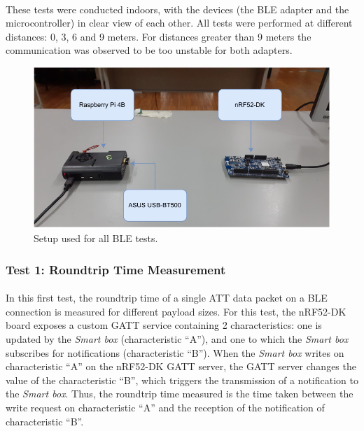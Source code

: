 \paragraph{} These tests were conducted indoors, with the devices (the \acs{BLE} adapter and the microcontroller) in clear view of each other. All tests were performed at different distances: 0, 3, 6 and 9 meters. For distances greater than 9 meters the communication was observed to be too unstable for both adapters. 

\begin{figure}[H]
    \centering
    \includegraphics[width=0.75\linewidth]{images/ble test setup.pdf}
    \caption{Setup used for all \acs{BLE} tests.}
    \label{fig:ble-test-setup}
\end{figure}

\subsubsection{Test 1: Roundtrip Time Measurement}

\paragraph{} In this first test, the roundtrip time of a single \acs{ATT} data packet on a \acs{BLE} connection is measured for different payload sizes. For this test, the nRF52-DK board exposes a custom \acs{GATT} service containing 2 characteristics: one is updated by the \textit{Smart box} (characteristic ``A''), and one to which the \textit{Smart box} subscribes for notifications (characteristic ``B''). When the \textit{Smart box} writes on characteristic ``A'' on the nRF52-DK \acs{GATT} server, the \acs{GATT} server changes the value of the characteristic ``B'', which triggers the transmission of a notification to the \textit{Smart box}. Thus, the roundtrip time measured is the time taken between the write request on characteristic ``A'' and the reception of the notification of characteristic ``B''. 

